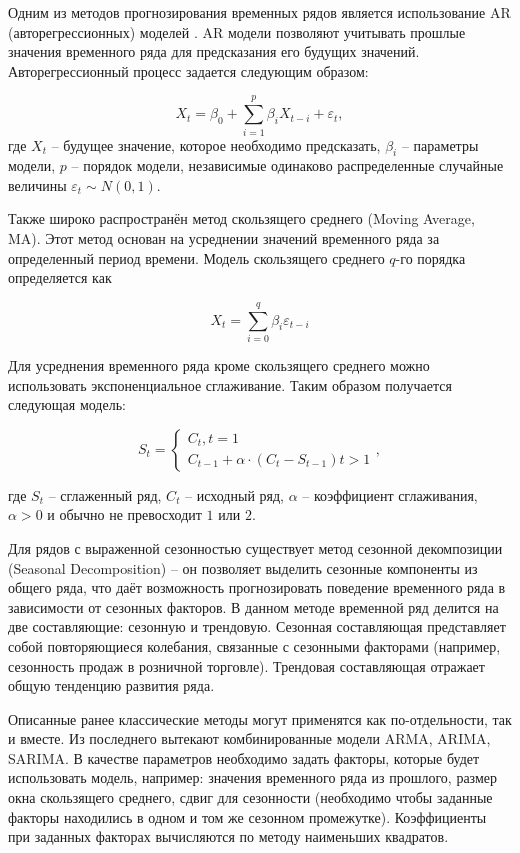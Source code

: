 \documentclass[diploma]{nanolab2015}
\begin{document}
Одним из методов прогнозирования временных рядов является использование AR (авторегрессионных) моделей \cite{book1}. AR модели позволяют учитывать прошлые значения временного ряда для предсказания его будущих значений. Авторегрессионный процесс задается следующим образом:

$$
    X_t = \beta_0 + \sum_{i=1}^{p}\beta_i X_{t-i} + \varepsilon_t,
$$
где $X_t$ -- будущее значение, которое необходимо предсказать, $\beta_i$ -- параметры модели, $p$ -- порядок модели, независимые одинаково распределенные случайные величины $\varepsilon_t \sim N(0, 1)$.

Также широко распространён метод скользящего среднего (Moving Average, MA). Этот метод основан на усреднении значений временного ряда за определенный период времени. Модель скользящего среднего $q$-го порядка определяется как

$$
    X_t = \sum_{i=0}^{q}\beta_i \varepsilon_{t-i}
$$

Для усреднения временного ряда кроме скользящего среднего можно использовать экспоненциальное сглаживание. Таким образом получается следующая модель\cite{book2}:

$$
    S_t =
    \begin{cases}
        C_t, t = 1 \\
        C_{t-1} + \alpha \cdot (C_t - S_{t-1}) t > 1
    \end{cases},
$$

где $S_t$ -- сглаженный ряд, $C_t$ -- исходный ряд, $\alpha$ -- коэффициент сглаживания, $\alpha > 0$ и обычно не превосходит $1$ или $2$.

Для рядов с выраженной сезонностью существует метод сезонной декомпозиции (Seasonal Decomposition) -- он позволяет выделить сезонные компоненты из общего ряда, что даёт возможность прогнозировать поведение временного ряда в зависимости от сезонных факторов. В данном методе временной ряд делится на две составляющие: сезонную и трендовую. Сезонная составляющая представляет собой повторяющиеся колебания, связанные с сезонными факторами (например, сезонность продаж в розничной торговле). Трендовая составляющая отражает общую тенденцию развития ряда\cite{book3}\cite{book4}.

Описанные ранее классические методы могут применятся как по-отдельности, так и вместе. Из последнего вытекают комбинированные модели ARMA, ARIMA, SARIMA. В качестве параметров необходимо задать факторы, которые будет использовать модель, например: значения временного ряда из прошлого, размер окна скользящего среднего, сдвиг для сезонности (необходимо чтобы заданные факторы находились в одном и том же сезонном промежутке). Коэффициенты при заданных факторах вычисляются по методу наименьших квадратов\cite{book5}.
\end{document}
